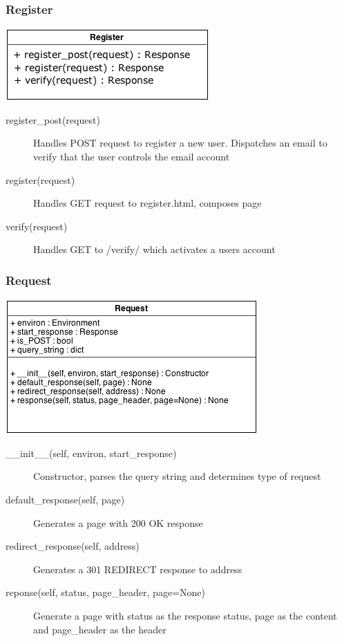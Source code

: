 \documentclass[12pt]{scrartcl}
\begin{document}
\subsubsection{Register}
\includegraphics[keepaspectratio]{umls/register_uml.png}
\begin{description}
\item[register\_post(request)] Handles POST request to register a new user. Dispatches an email to verify that the user controls the email account
\item [register(request)] Handles GET request to register.html, composes page
\item [verify(request)] Handles GET to /verify/ which activates a users account
\end{description}

\subsubsection{Request}
\includegraphics[keepaspectratio]{umls/request_uml.png}
\begin{description}
\item [\_\_init\_\_(self, environ, start\_response)] Constructor, parses the query string and determines type of request
\item [default\_response(self, page)] Generates a page with 200 OK response
\item [ redirect\_response(self, address)] Generates a 301 REDIRECT response to address
\item [reponse(self, status, page\_header, page=None)] Generate a page with status as the response status, page as the content and page\_header as the header
\end{description}
\end{document}
